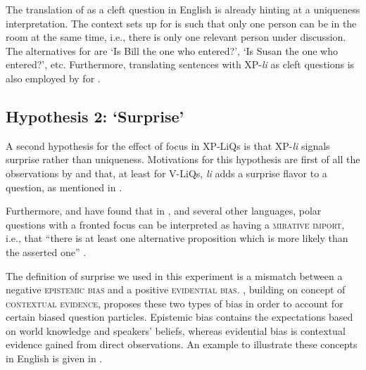 \documentclass[output=paper,
colorlinks,
citecolor=brown,
newtxmath
]{langscibook}
\begin{document}
\noindent
The translation of  as a cleft question in English is already hinting at a uniqueness interpretation. The context \citet{dukova2010} sets up for  is such that only one person can be in the room at the same time, i.e., there is only one relevant person under discussion. The alternatives for  are `Is Bill the one who entered?', `Is Susan the one who entered?', etc. Furthermore, translating sentences with XP-\textit{li} as cleft questions is also employed by \citet{king1994} for .



\subsection{Hypothesis 2: `Surprise'}\label{sec:surprise}
A second hypothesis for the effect of focus in XP-LiQs is that XP-\textit{li} signals surprise rather than uniqueness. Motivations for this hypothesis are first of all the observations by \citet{Rudin.Kramer.Billings.Baerman1999} and \citet{lazarova2003} that, at least for V-LiQs, \textit{li} adds a surprise flavor to a question, as mentioned in .


Furthermore, \citet{bianchi.cruschina2016} and \citet{bianchi.bocci.cruschina2016} have found that in , and several other languages, polar questions with a fronted focus can be interpreted as having a \textsc{mirative import}, i.e., that ``there is at least one alternative proposition which is more likely than the asserted one'' \citep[60]{bianchi.cruschina2016}.

The definition of surprise we used in this experiment is a mismatch between a negative \textsc{epistemic bias}  and a positive \textsc{evidential bias}. \citet{sudo2013}, building on  concept of \textsc{contextual evidence}, proposes these two types of bias in order to account for certain  biased question particles.
Epistemic bias contains the expectations based on world knowledge and speakers' beliefs, whereas evidential bias is contextual evidence gained from direct observations. An example to illustrate these concepts in English is given in .
\end{document}
